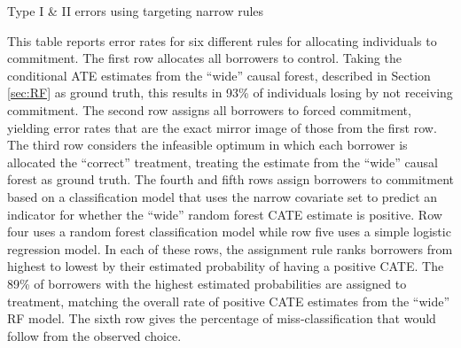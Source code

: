 \documentclass[oneside,11pt]{article}
\begin{document}
\begin{table}[H]
\caption{Type I \& II errors using targeting narrow rules}
\label{hit_miss_rule}
\begin{center}
\resizebox{0.95\textwidth}{!}{
\small{}
}
\end{center}
\scriptsize This table reports error rates for six different rules for allocating individuals to commitment. The first row allocates all borrowers to control. Taking the conditional ATE estimates from the ``wide'' causal forest, described in Section \ref{sec:RF} as ground truth, this results in 93\% of individuals losing by not receiving commitment. The second row assigns all borrowers to forced commitment, yielding error rates that are the exact mirror image of those from the first row.  The third row considers the infeasible optimum in which each borrower is allocated the ``correct'' treatment, treating the estimate from the ``wide'' causal forest as ground truth. The fourth and fifth rows assign borrowers to commitment based on a classification model that uses the narrow covariate set to predict an indicator for whether the ``wide'' random forest CATE estimate is positive. Row four uses a random forest classification model while row five uses a simple logistic regression model. In each of these rows, the assignment rule ranks borrowers from highest to lowest by their estimated probability of having a positive CATE. The 89\% of borrowers with the highest estimated probabilities are assigned to treatment, matching the overall rate of positive CATE estimates from the ``wide'' RF model. The sixth row gives the percentage of miss-classification that would follow from the observed choice. 

\end{table} 

\vspace{.3in}
\end{document}
